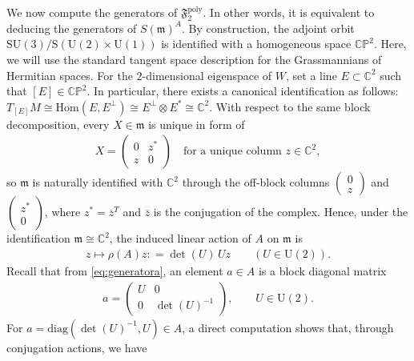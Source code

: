 \documentclass[11pt]{amsart}
\theoremstyle{definition}
\theoremstyle{plain}
\theoremstyle{conclusion}
\begin{document}
We now compute the generators of $\mathfrak{F}_2^{\mathrm{poly}}$. In other words, it is equivalent to deducing the generators of $S(\mathfrak{m})^A$. By construction, the adjoint orbit $\mathrm{SU}(3)/\mathrm{S}(\mathrm{U}(2) \times \mathrm{U}(1))$ is identified with a homogeneous space $\mathbb{CP}^2$. Here, we will use the standard tangent space description for the Grassmannians of Hermitian spaces. For the $2$-dimensional eigenspace of $W$, set a line $E \subset \mathbb{C}^2$ such that $[E] \in \mathbb{CP}^2$. In particular, there exists a canonical identification as follows: $T_{[E]}M \cong \mathrm{Hom}(E,E^\perp) \cong E^\perp \otimes E^* \cong \mathbb{C}^2$.  With respect to the same block decomposition, %
every $X\in \mathfrak{m}$ is unique in form of
\begin{align*}
X=\begin{pmatrix} 0 & z^{ *}\\[2pt] z & 0\end{pmatrix}\quad\text{for a unique column }z\in\mathbb{C}^2,
\end{align*} so $\mathfrak{m}$ is naturally identified with $\mathbb{C}^2$ through the off-block columns $\begin{pmatrix}
    0\\
    z
\end{pmatrix}$ and $\begin{pmatrix}
    z^* \\
    0
\end{pmatrix}$, where $z^* = \overline{z}^T$ and $\overline{z}$ is the conjugation of the complex. Hence, under the identification $\mathfrak{m}\cong\mathbb{C}^2$, the induced linear action of $A$ on $\mathfrak{m}$ is \begin{align*}
z\longmapsto \rho(A)z: = \det(U)\,U z\qquad(U\in \mathrm{U}(2)).
\end{align*}   Recall that from \eqref{eq:generatora}, an element $a\in A$ is a block diagonal matrix \begin{align*}
    a=\begin{pmatrix} U & 0\\ 0 & \det(U)^{-1}\end{pmatrix},\qquad U\in \mathrm{U}(2). 
\end{align*} For $a=\mathrm{diag}(\det(U)^{-1},U)\in A$, a direct computation shows that, through conjugation actions, we have  
\end{document}
